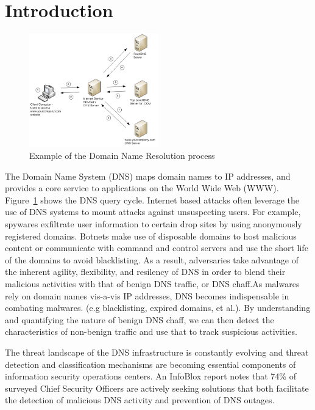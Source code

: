 \documentclass{acm_proc_article-sp}
\begin{document}
\section{Introduction}


\begin{figure}[h]
\includegraphics[width=0.5\textwidth]{images/DNS_basics.png}
\caption{Example of the Domain Name Resolution process \cite{DNS_fig}}\label{dns_diagram}
\end{figure}

The Domain Name System (DNS) \cite{rfc1034, rfc1035} maps domain names to IP addresses, and provides a core service to applications on the World Wide Web (WWW). Figure~\ref{dns_diagram} shows the DNS query cycle. Internet based attacks often leverage the use of DNS systems to mount attacks against unsuspecting users. For example, spywares exfiltrate user information to certain drop sites by using anonymously registered domains. Botnets make use of disposable domains to host malicious content or communicate with command and control servers and use the short life of the domains to avoid blacklisting. As a result, adversaries take advantage of the inherent agility, flexibility, and resilency of DNS in order to blend their malicious activities with that of benign DNS traffic, or DNS chaff.As malwares rely on domain names vis-a-vis IP addresses, DNS becomes indispensable in combating malwares. (e.g blacklisting, expired domains, et al.). By understanding and quantifying the nature of benign DNS chaff, we can then detect the characteristics of non-benign traffic and use that to track suspicious activities.

The threat landscape of the DNS infrastructure is constantly evolving and threat detection and classification mechanisms are becoming essential components of information security operations centers. An InfoBlox report notes that 74\%  of surveyed Chief Security Officers are actively seeking solutions that both facilitate the detection of malicious DNS activity and prevention of DNS outages.\cite{InfobloxPaper}
\end{document}
